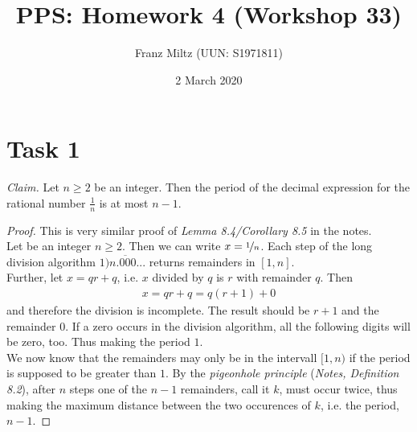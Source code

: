 \documentclass{article}
\title{PPS: Homework 4 (Workshop 33)}
\author{Franz Miltz (UUN: S1971811)}
\date{2 March 2020}
\begin{document}
\maketitle
\section*{Task 1}
\emph{Claim.} Let $n\geq 2$ be an integer. Then the period of the decimal expression for the rational number $\frac{1}{n}$ is at most $n-1$.
\begin{proof}
	This is very similar proof of \emph{Lemma 8.4/Corollary 8.5} in the notes.\\
	Let be an integer $n\geq 2$. Then we can write $x=\nicefrac{1}{n}$. Each step of the long division algorithm $1\overline{)n.000...}$ returns remainders in $[1,n]$.\\
	Further, let $x=qr+q$, i.e. $x$ divided by $q$ is $r$ with remainder $q$. Then
	\begin{align*}
		x = qr+q = q(r+1)+0
	\end{align*}
	and therefore the division is incomplete. The result should be $r+1$ and the remainder $0$. If a zero occurs in the division algorithm, all the following digits will be zero, too. Thus making the period $1$.\\
	We now know that the remainders may only be in the intervall $[1, n)$ if the period is supposed to be greater than $1$. By the \emph{pigeonhole principle} (\emph{Notes, Definition 8.2}), after $n$ steps one of the $n-1$ remainders, call it $k$, must occur twice, thus making the maximum distance between the two occurences of $k$, i.e. the period, $n-1$.

\end{proof}
\end{document}
